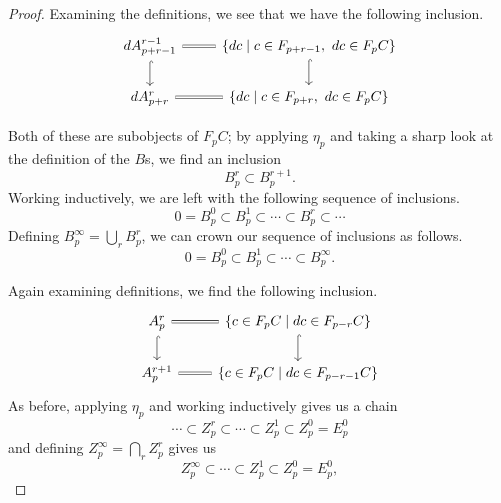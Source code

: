 \documentclass[main.tex]{subfiles}
\begin{document}
\begin{proof}
  Examining the definitions, we see that we have the following inclusion.
  \begin{equation*}
    \begin{tikzcd}
      dA^{r-1}_{p+r-1}
      \arrow[r, equals]
      \arrow[d, hook]
      & \{dc \mid c \in F_{p+r-1},\ dc \in F_{p}C\}
      \arrow[d, hook]
      \\
      dA^{r}_{p+r}
      \arrow[r, equals]
      & \{dc \mid c \in F_{p+r},\ dc \in F_{p}C\}
    \end{tikzcd}
  \end{equation*}

  Both of these are subobjects of $F_{p}C$; by applying $\eta_{p}$ and taking a sharp look at the definition of the $B$s, we find an inclusion
  \begin{equation*}
    B^{r}_{p} \subset B^{r+1}_{p}.
  \end{equation*}
  Working inductively, we are left with the following sequence of inclusions.
  \begin{equation*}
    0 = B^{0}_{p} \subset B^{1}_{p} \subset \cdots \subset B^{r}_{p} \subset \cdots
  \end{equation*}
  Defining $B^{\infty}_{p} = \bigcup_{r} B^{r}_{p}$, we can crown our sequence of inclusions as follows.
  \begin{equation*}
    0 = B^{0}_{p} \subset B^{1}_{p} \subset \cdots \subset B^{\infty}_{p}.
  \end{equation*}

  Again examining definitions, we find the following inclusion.
  \begin{equation*}
    \begin{tikzcd}
      A^{r}_{p}
      \arrow[r, equals]
      \arrow[d, hook]
      & \{c \in F_{p}C \mid dc \in F_{p-r}C\}
      \arrow[d, hook]
      \\
      A^{r+1}_{p}
      \arrow[r, equals]
      & \{c \in F_{p}C \mid dc \in F_{p-r-1}C\}
    \end{tikzcd}
  \end{equation*}
  As before, applying $\eta_{p}$ and working inductively gives us a chain
  \begin{equation*}
    \cdots \subset Z^{r}_{p} \subset \cdots \subset Z^{1}_{p} \subset Z^{0}_{p} = E^{0}_{p}
  \end{equation*}
  and defining $Z^{\infty}_{p} = \bigcap_{r} Z^{r}_{p}$ gives us
  \begin{equation*}
    Z^{\infty}_{p} \subset \cdots \subset Z^{1}_{p} \subset Z^{0}_{p} = E^{0}_{p},
  \end{equation*}


\end{proof}
\end{document}
